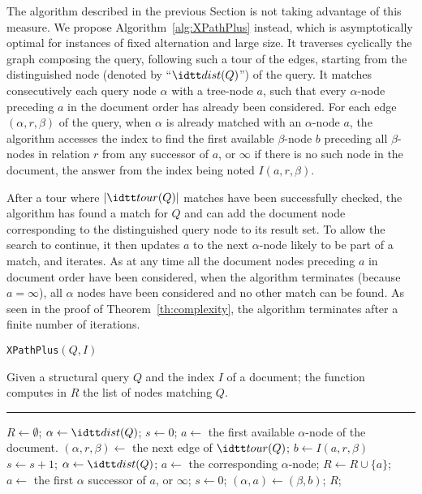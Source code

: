 The algorithm described in the previous Section is not taking advantage of this measure.
%
We propose Algorithm~\ref{alg:XPathPlus} instead, which is
asymptotically optimal for instances of fixed alternation and large
size.
%
It traverses cyclically the graph composing the query, following such
a tour of the edges, starting from the distinguished node (denoted by
``$\dist(Q)$'') of the query.
%
It matches consecutively each query node $\alpha$ with a tree-node
$a$, such that every $\alpha$-node preceding $a$ in the document order
has already been considered.
%
For each edge $(\alpha,r,\beta)$ of the query, when $\alpha$ is
already matched with an $\alpha$-node $a$, the algorithm accesses the
index to find the first available $\beta$-node $b$ preceding all
$\beta$-nodes in relation $r$ from any successor of $a$, or $\infty$
if there is no such node in the document, the answer from the index
being noted $I(a,r,\beta)$.


After a tour where $|\tour(Q)|$ matches have been successfully
checked, the algorithm has found a match for $Q$ and can add the
document node corresponding to the distinguished query node to its
result set. To allow the search to continue, it then updates $a$ to
the next $\alpha$-node likely to be part of a match, and iterates.
%
As at any time all the document nodes preceding $a$ in document order
have been considered, when the algorithm terminates (because
$a=\infty$), all $\alpha$ nodes have been considered and no other
match can be found.
%
As seen in the proof of Theorem~\ref{th:complexity}, the algorithm
terminates after a finite number of iterations.


\begin{algorithm}
\caption{{\tt XPathPlus$(Q,I)$}}
\label{alg:XPathPlus}
Given a structural query $Q$ and the index $I$ of a document;
%
the function computes in $R$ the list of nodes matching $Q$.
\medskip\hrule
\begin{minipage}{.49\textwidth}
\begin{algorithmic}
\STATE $R\leftarrow\emptyset$; $\alpha\leftarrow\dist(Q)$;  $s\leftarrow0$;
\STATE $a\leftarrow$ the first available $\alpha$-node of the document.
  \STATE $(\alpha,r,\beta) \leftarrow$ the next edge of $\tour(Q)$;
  \STATE $b \leftarrow I(a,r,\beta)$
     \STATE $s\leftarrow s+1$;
       \STATE $\alpha\leftarrow\dist(Q)$; $a\leftarrow$ the corresponding $\alpha$-node;
       \STATE $R\leftarrow R\cup\{a\}$;
       \STATE $a\leftarrow$ the first $\alpha$ successor of $a$, or $\infty$;
     \ENDIF
  \ELSE
    \STATE $s\leftarrow 0$;
  \ENDIF
  \STATE $(\alpha,a)\leftarrow(\beta,b)$; 
\ENDWHILE 
{} $R$;
\end{algorithmic}
\end{minipage}
\end{algorithm}





